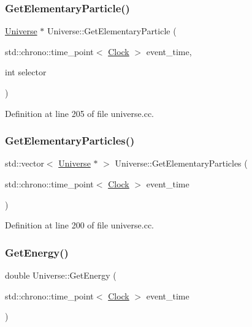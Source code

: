 \subsubsection{\texorpdfstring{Get\+Elementary\+Particle()}{GetElementaryParticle()}}
{\footnotesize\ttfamily \mbox{\hyperlink{class_universe}{Universe}} $\ast$ Universe\+::\+Get\+Elementary\+Particle (\begin{DoxyParamCaption}\item[{std\+::chrono\+::time\+\_\+point$<$ \mbox{\hyperlink{universe_8h_a0ef8d951d1ca5ab3cfaf7ab4c7a6fd80}{Clock}} $>$}]{event\+\_\+time,  }\item[{int}]{selector }\end{DoxyParamCaption})}



Definition at line 205 of file universe.\+cc.

\mbox{\label{class_universe_a168fd9bf7602adcba1de5dd93a212775}} 
\subsubsection{\texorpdfstring{Get\+Elementary\+Particles()}{GetElementaryParticles()}}
{\footnotesize\ttfamily std\+::vector$<$ \mbox{\hyperlink{class_universe}{Universe}} $\ast$ $>$ Universe\+::\+Get\+Elementary\+Particles (\begin{DoxyParamCaption}\item[{std\+::chrono\+::time\+\_\+point$<$ \mbox{\hyperlink{universe_8h_a0ef8d951d1ca5ab3cfaf7ab4c7a6fd80}{Clock}} $>$}]{event\+\_\+time }\end{DoxyParamCaption})}



Definition at line 200 of file universe.\+cc.

\mbox{\label{class_universe_a3b25e7ce6552991b7d5e6a9eb6e8a7ff}} 
\subsubsection{\texorpdfstring{Get\+Energy()}{GetEnergy()}}
{\footnotesize\ttfamily double Universe\+::\+Get\+Energy (\begin{DoxyParamCaption}\item[{std\+::chrono\+::time\+\_\+point$<$ \mbox{\hyperlink{universe_8h_a0ef8d951d1ca5ab3cfaf7ab4c7a6fd80}{Clock}} $>$}]{event\+\_\+time }\end{DoxyParamCaption})}



